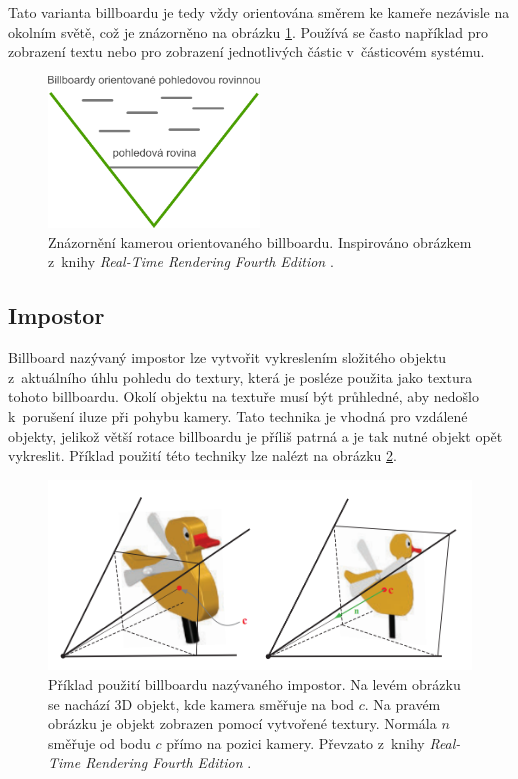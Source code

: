 Tato varianta billboardu je tedy vždy orientována směrem ke kameře nezávisle na okolním světě, což je znázorněno na obrázku \ref{fig:billboard_camera_aligned}. Používá se často například pro zobrazení textu nebo pro zobrazení jednotlivých částic v~částicovém systému.
\begin{figure}[H]
	\centering
	\includegraphics[width=0.5\textwidth]{obrazky-figures/viewplanealigned.pdf}
	\caption{Znázornění kamerou orientovaného billboardu. Inspirováno obrázkem z~knihy \emph{Real-Time Rendering Fourth Edition} \cite[kapitola 13.6]{ller2018real}. }
	\label{fig:billboard_camera_aligned}
\end{figure}
\subsection{Impostor}
Billboard nazývaný impostor lze vytvořit vykreslením složitého objektu z~aktuálního úhlu pohledu do textury, která je posléze použita jako textura tohoto billboardu. Okolí objektu na textuře musí být průhledné, aby nedošlo k~porušení iluze při pohybu kamery. Tato technika je vhodná pro vzdálené objekty, jelikož větší rotace billboardu je příliš patrná a je tak nutné objekt opět vykreslit. Příklad použití této techniky lze nalézt na obrázku \ref{fig:billboard_impostor_expample}.
\begin{figure}[h]
	\centering
	\includegraphics[width=1.0\textwidth]{obrazky-figures/test5.png}
	\caption{Příklad použití billboardu nazývaného impostor. Na levém obrázku se nachází 3D objekt, kde kamera směřuje na bod \(c\). Na pravém obrázku je objekt zobrazen pomocí vytvořené textury. Normála \(n\) směřuje od bodu \(c\) přímo na pozici kamery. Převzato z~knihy \emph{Real-Time Rendering Fourth Edition} \cite[kapitola 13.6]{ller2018real}. }
	\label{fig:billboard_impostor_expample}
\end{figure}

